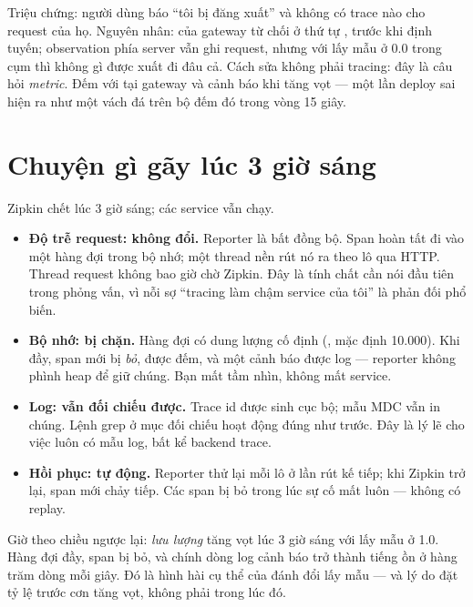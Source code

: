 \begin{pitfall}
Triệu chứng: người dùng báo ``tôi bị đăng xuất'' và không có trace nào
cho request của họ. Nguyên nhân:  của
gateway từ chối ở thứ tự , trước khi định tuyến; observation
phía server vẫn ghi request, nhưng với lấy mẫu ở 0.0 trong cụm thì
không gì được xuất đi đâu cả. Cách sửa không phải tracing: đây là câu
hỏi \emph{metric}. Đếm  với
 tại gateway và cảnh báo khi tăng vọt --- một lần
deploy sai  hiện ra như một vách đá trên bộ đếm đó
trong vòng 15 giây.
\end{pitfall}

\section{Chuyện gì gãy lúc 3 giờ sáng}

Zipkin chết lúc 3 giờ sáng; các service vẫn chạy.

\begin{itemize}
  \item \textbf{Độ trễ request: không đổi.} Reporter là bất đồng bộ.
  Span hoàn tất đi vào một hàng đợi trong bộ nhớ; một thread nền rút nó
  ra theo lô qua HTTP. Thread request không bao giờ chờ Zipkin. Đây là
  tính chất cần nói đầu tiên trong phỏng vấn, vì nỗi sợ ``tracing làm
  chậm service của tôi'' là phản đối phổ biến.
  \item \textbf{Bộ nhớ: bị chặn.} Hàng đợi có dung lượng cố định
  (, mặc định 10.000). Khi đầy, span mới bị
  \emph{bỏ}, được đếm, và một cảnh báo được log --- reporter không
  phình heap để giữ chúng. Bạn mất tầm nhìn, không mất service.
  \item \textbf{Log: vẫn đối chiếu được.} Trace id được sinh cục bộ;
  mẫu MDC vẫn in chúng. Lệnh grep ở mục đối chiếu hoạt động đúng như
  trước. Đây là lý lẽ cho việc luôn có mẫu log, bất kể backend trace.
  \item \textbf{Hồi phục: tự động.} Reporter thử lại mỗi lô ở lần rút
  kế tiếp; khi Zipkin trở lại, span mới chảy tiếp. Các span bị bỏ trong
  lúc sự cố mất luôn --- không có replay.
\end{itemize}

Giờ theo chiều ngược lại: \emph{lưu lượng} tăng vọt lúc 3 giờ sáng với
lấy mẫu ở 1.0. Hàng đợi đầy, span bị bỏ, và chính dòng log cảnh báo
trở thành tiếng ồn ở hàng trăm dòng mỗi giây. Đó là hình hài cụ thể của
đánh đổi lấy mẫu --- và lý do đặt tỷ lệ trước cơn tăng vọt, không phải
trong lúc đó.

